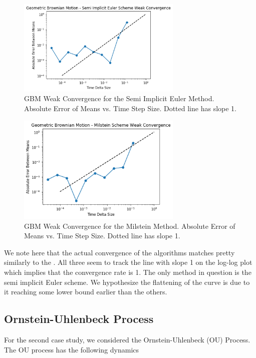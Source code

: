 \documentclass[notitlepage,pra,10pt,aps]{revtex4-2}
\begin{document}
  \begin{figure}[H]
    \centering
      \includegraphics[width=0.7\textwidth]{gbm_semi.png}
    \caption{GBM Weak Convergence for the Semi Implicit Euler Method. Absolute Error of Means vs. Time Step Size. Dotted line has slope 1.}
  \end{figure}

  \begin{figure}[H]
    \centering
      \includegraphics[width=0.7\textwidth]{gbm_milstein.png}
    \caption{GBM Weak Convergence for the Milstein Method. Absolute Error of Means vs. Time Step Size. Dotted line has slope 1.}
  \end{figure}

  We note here that the actual convergence of the algorithms matches pretty similarly to the . All three seem to track the line with slope 1 on the log-log plot which implies that the convergence rate is 1. The only method in question is the semi implicit Euler scheme. We hypothesize the flattening of the curve is due to it reaching some lower bound earlier than the others.

  \subsection{Ornstein-Uhlenbeck Process}

  For the second case study, we considered the Ornstein-Uhlenbeck (OU) Process. The OU process has the following dynamics
\end{document}
